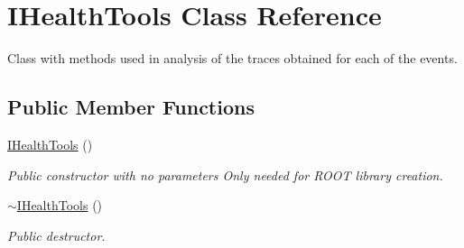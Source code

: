 \hypertarget{classIHealthTools}{}\section{I\+Health\+Tools Class Reference}
\label{classIHealthTools}


Class with methods used in analysis of the traces obtained for each of the events.  


\subsection*{Public Member Functions}
\begin{DoxyCompactItemize}
\item 
\mbox{\label{classIHealthTools_a1f3acfba154e7662a740a113160005fa}} 
\hyperlink{classIHealthTools_a1f3acfba154e7662a740a113160005fa}{I\+Health\+Tools} ()
\begin{DoxyCompactList}\small\item\em Public constructor with no parameters Only needed for R\+O\+OT library creation. \end{DoxyCompactList}\item 
\mbox{\label{classIHealthTools_a2dd894876801a649b6384be460f1bcda}} 
\hyperlink{classIHealthTools_a2dd894876801a649b6384be460f1bcda}{$\sim$\+I\+Health\+Tools} ()
\begin{DoxyCompactList}\small\item\em Public destructor. \end{DoxyCompactList}\end{DoxyCompactItemize}
